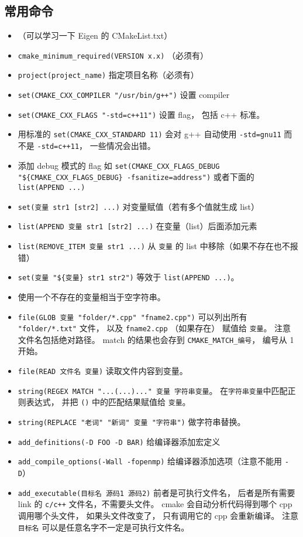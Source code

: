\subsection{常用命令}
\begin{itemize}
\item （可以学习一下 Eigen 的 CMakeList.txt）
\item \verb`cmake_minimum_required(VERSION x.x)` （必须有）
\item \verb`project(project_name)` 指定项目名称（必须有）
\item \verb|set(CMAKE_CXX_COMPILER "/usr/bin/g++")| 设置 compiler
\item \verb|set(CMAKE_CXX_FLAGS "-std=c++11")| 设置 flag， 包括 c++ 标准。
\item 用标准的 \verb|set(CMAKE_CXX_STANDARD 11)| 会对 g++ 自动使用 \verb|-std=gnu11| 而不是 \verb|-std=c++11|， 一些情况会出错。
\item 添加 debug 模式的 flag 如 \verb|set(CMAKE_CXX_FLAGS_DEBUG "${CMAKE_CXX_FLAGS_DEBUG} -fsanitize=address")| 或者下面的 \verb`list(APPEND ...)`
\item \verb`set(变量 str1 [str2] ...)` 对变量赋值（若有多个值就生成 list）
\item \verb`list(APPEND 变量 str1 [str2] ...)` 在变量（list）后面添加元素
\item \verb|list(REMOVE_ITEM 变量 str1 ...)| 从 \verb|变量| 的 list 中移除（如果不存在也不报错）
\item \verb|set(变量 "${变量} str1 str2")| 等效于 \verb`list(APPEND ...)`。
\item 使用一个不存在的变量相当于空字符串。
\item \verb`file(GLOB 变量 "folder/*.cpp" "fname2.cpp")` 可以列出所有 \verb|"folder/*.txt"| 文件， 以及 \verb|fname2.cpp| （如果存在） 赋值给 \verb|变量|。 注意文件名包括绝对路径。 match 的结果也会存到 \verb|CMAKE_MATCH_编号|， 编号从 1 开始。
\item \verb|file(READ 文件名 变量)| 读取文件内容到变量。
\item \verb|string(REGEX MATCH "...(...)..." 变量 字符串变量|。 在\verb|字符串变量|中匹配正则表达式， 并把 \verb|()| 中的匹配结果赋值给 \verb|变量|。
\item \verb|string(REPLACE "老词" "新词" 变量 "字符串")| 做字符串替换。
\item \verb|add_definitions(-D FOO -D BAR)| 给编译器添加宏定义
\item \verb|add_compile_options(-Wall -fopenmp)| 给编译器添加选项（注意不能用 \verb|-D|）
\item \verb`add_executable(目标名 源码1 源码2)` 前者是可执行文件名， 后者是所有需要 link 的 \verb|c/c++| 文件名，不需要头文件。 cmake 会自动分析代码得到哪个 cpp 调用哪个头文件， 如果头文件改变了， 只有调用它的 cpp 会重新编译。 注意 \verb|目标名| 可以是任意名字不一定是可执行文件名。

\end{itemize}
